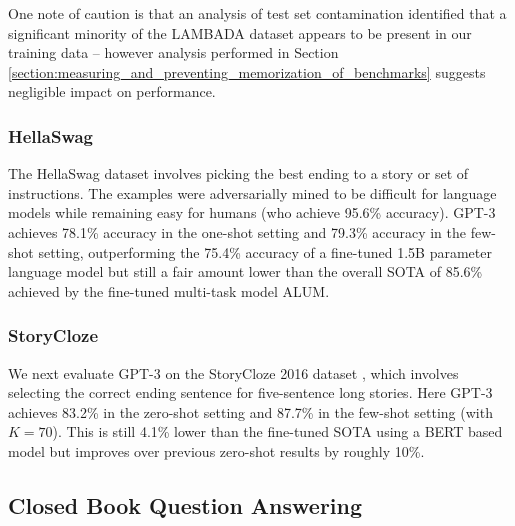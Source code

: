 One note of caution is that an analysis of test set contamination identified that a significant minority of the LAMBADA dataset appears to be present in our training data -- however analysis performed in Section \ref{section:measuring_and_preventing_memorization_of_benchmarks} suggests negligible impact on performance.

        \subsubsection{HellaSwag}
        \label{section:HellaSwag}

The HellaSwag dataset \cite{zellers2019hellaswag} involves picking the best ending to a story or set of instructions.  The examples were adversarially mined to be difficult for language models while remaining easy for humans (who achieve 95.6\% accuracy).  GPT-3 achieves 78.1\% accuracy in the one-shot setting and 79.3\% accuracy in the few-shot setting, outperforming the 75.4\% accuracy of a fine-tuned 1.5B parameter language model \cite{zellers2019defending} but still a fair amount lower than the overall SOTA of 85.6\% achieved by the fine-tuned multi-task model ALUM.

        \subsubsection{StoryCloze}
        \label{section:StoryCloze}

We next evaluate GPT-3 on the StoryCloze 2016 dataset \cite{mostafazadeh2016corpus}, which involves selecting the correct ending sentence for five-sentence long stories.  Here GPT-3 achieves 83.2\% in the zero-shot setting and 87.7\% in the few-shot setting (with $K=70$). This is still 4.1\% lower than the fine-tuned SOTA using a BERT based model \cite{li2019story} but improves over previous zero-shot results by roughly 10\%.

    \subsection{Closed Book Question Answering}
    \label{section:Closed Book Question Answering / Knowledge Base Tasks}

